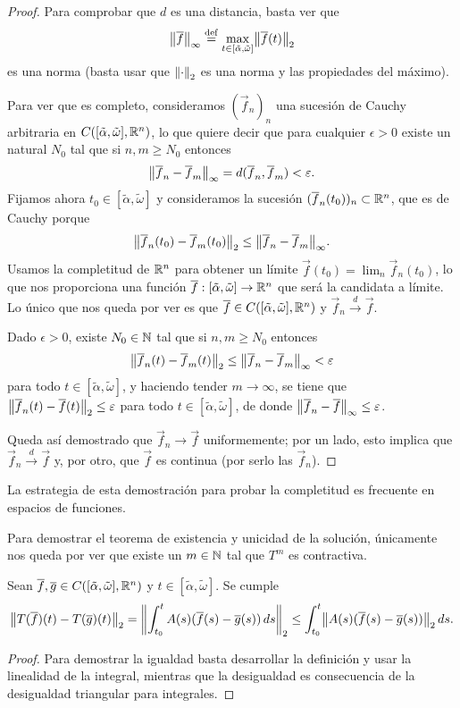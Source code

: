 \documentclass[../ecuaciones_diferenciales.tex]{subfiles}
\begin{document}
\begin{proof}
	Para comprobar que \(d\) es una distancia, basta ver que
	\[\norm{\vec{f}}_\infty
		\eqdef \max_{t \in [\tilde{\alpha}, \tilde{\omega}]}
			\norm{\vec{f}(t)}_2\]
	es una norma (basta usar que \(\norm{\cdot}_2\) es una norma y las
	propiedades del máximo).

	Para ver que es completo, consideramos \((\vec{f}_n)_n\) una sucesión de
	Cauchy arbitraria en \(C([\tilde{\alpha}, \tilde{\omega}], \mathbb{R}^n)\),
	lo que quiere decir que para cualquier \(\epsilon > 0\) existe un
	natural \(N_0\) tal que si \(n, m \geq N_0\) entonces
	\[\norm{\vec{f}_n - \vec{f}_m}_\infty
		= d(\vec{f}_n, \vec{f}_m) < \epsilon.\]
	Fijamos ahora \(t_0 \in [\tilde{\alpha}, \tilde{\omega}]\) y consideramos la
	sucesión \((\overline{f}_n(t_0))_n \subset \mathbb{R}^n\), que es de Cauchy porque
	\[\norm{\vec{f}_n(t_0) - \vec{f}_m(t_0)}_2
		\leq \norm{\vec{f}_n - \vec{f}_m}_\infty.\]
	Usamos la completitud de \(\mathbb{R}^n\) para obtener un límite
	\(\vec{f}(t_0) = \lim_n \vec{f}_n(t_0)\), lo
	que nos proporciona una función
	\(\overline{f}: [\tilde{\alpha}, \tilde{\omega}] \to \mathbb{R}^n\) que será la candidata
	a límite. Lo único que nos queda por ver es que
	\(\overline{f} \in C([\tilde{\alpha}, \tilde{\omega}], \mathbb{R}^n)\) y
	\(\vec{f}_n \overset{d}{\to} \vec{f}\).

	Dado \(\epsilon > 0\), existe \(N_0 \in \mathbb{N}\) tal que si \(n, m \geq N_0\)
	entonces
	\[\norm{\vec{f}_n(t) - \vec{f}_m(t)}_2
		\leq \norm{\vec{f}_n - \vec{f}_m}_\infty < \epsilon\]
	para todo \(t \in [\tilde{\alpha}, \tilde{\omega}]\), y haciendo tender
	\(m \to \infty\), se tiene que
	\(\norm{\vec{f}_n(t) - \vec{f}(t)}_2 \leq \epsilon\) para todo
	\(t \in [\tilde{\alpha}, \tilde{\omega}]\), de donde
	\(\norm{\vec{f}_n - \vec{f}}_\infty \leq \epsilon\).

	Queda así demostrado que \(\vec{f}_n \to \vec{f}\) uniformemente;
	por un lado, esto implica que \(\vec{f}_n \overset{d}{\to} \vec{f}\) y,
	por otro, que \(\vec{f}\) es continua (por serlo las \(\vec{f}_n\)).
\end{proof}

\begin{remark}
	La estrategia de esta demostración para probar la completitud es frecuente en
	espacios de funciones.
\end{remark}

Para demostrar el teorema de existencia y unicidad de la solución, únicamente
nos queda por ver que existe un \(m \in \mathbb{N}\) tal que \(T^m\) es contractiva.

\begin{lemma} \label{prop:operator_int_ineq}
	Sean \(\overline{f}, \overline{g} \in C([\tilde{\alpha}, \tilde{\omega}], \mathbb{R}^n)\) y
	\(t \in [\tilde{\alpha}, \tilde{\omega}]\). Se cumple
	\[\norm{T(\vec{f})(t) - T(\vec{g})(t)}_2
		= \norm{\int_{t_0}^t A(s)(\vec{f}(s) - \vec{g}(s)) \dif s}_2
		\leq \int_{t_0}^t \norm{A(s)(\vec{f}(s) - \vec{g}(s))}_2 \dif s.\]
\end{lemma}
\begin{proof}
    Para demostrar la igualdad basta desarrollar la definición y usar la
    linealidad de la integral, mientras que la desigualdad es consecuencia
    de la desigualdad triangular para integrales.
\end{proof}
\end{document}
